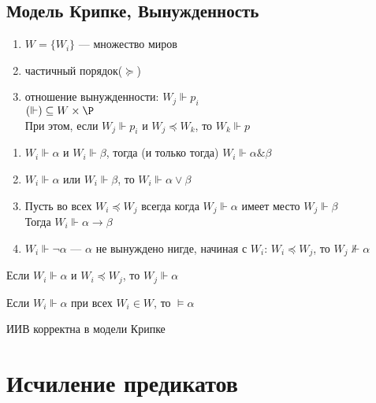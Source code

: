 \documentclass[english]{article}
\begin{document}
\subsection{Модель Крипке, Вынужденность}
\label{sec:org1cad80a}
\begin{defintion}
	\-
	\begin{enumerate}
		\item \(W = \{W_i\}\) --- множество миров
		\item частичный порядок(\(\succeq\))
		\item отношение вынужденности: \(W_j \Vdash p_i\) \\
		      \((\Vdash)  \subseteq W \times \P\) \\
		      При этом, если \(W_j \Vdash p_i\) и \(W_j \preceq W_k\), то \(W_k \Vdash p\)
	\end{enumerate}
	\label{org7ec2d2e}
\end{defintion}
\begin{definition}
	\-
	\begin{enumerate}
		\item \(W_i \Vdash \alpha\) и \(W_i \Vdash \beta\), тогда (и только тогда) \(W_i \Vdash \alpha \& \beta\) \\
		\item \(W_i \Vdash \alpha\) или \(W_i \Vdash \beta\), то \(W_i \Vdash \alpha \vee \beta\)
		\item Пусть во всех \(W_i \preceq W_j\) всегда когда \(W_j \Vdash \alpha\) имеет место \(W_j \Vdash \beta\) \\
		      Тогда \(W_i \Vdash \alpha \to \beta\)
		\item \(W_i \Vdash \neg \alpha\) --- \(\alpha\) не вынуждено нигде, начиная с \(W_i\):
		      \(W_i \preceq W_j\), то \(W_j \not\Vdash \alpha\)
	\end{enumerate}
	\label{org1570c1d}
\end{definition}
\begin{theorem}
	Если \(W_i \Vdash \alpha\) и \(W_i \preceq W_j\), то \(W_j \Vdash \alpha\)
	\label{org21d327d}
\end{theorem}
\begin{definition}
	Если \(W_i \Vdash \alpha\) при всех \(W_i \in W\), то \(\vDash \alpha\)
	\label{org2a7aee4}
\end{definition}
\begin{theorem}
	ИИВ корректна в модели Крипке
	\label{org65995c8}
\end{theorem}
\section{Исчиление предикатов}
\label{sec:org1ae18f0}
\end{document}
